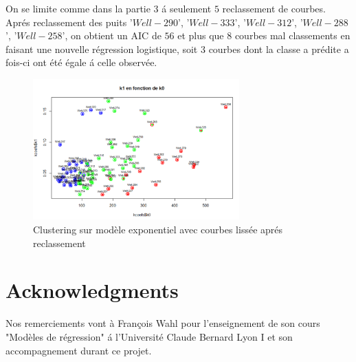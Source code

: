 \documentclass[12pt]{article}
\begin{document}
On se limite comme dans la partie $3$ \'a seulement $5$ reclassement de courbes.
Apr\'es reclassement des puits  '$Well-290$', '$Well-333$', '$Well-312$', '$Well-288$', '$Well-258$', on obtient un AIC de $56$ et plus que $8$ courbes mal classements en faisant une nouvelle r\'egression logistique, soit $3$ courbes dont la classe a  pr\'edite a fois-ci ont \'et\'e \'egale \'a celle observ\'ee.

\begin{figure}[H]
 \centering %
	\includegraphics[width=300px]{smooth_clustering_exp_2}
  \caption{\label{fig:reg_exp_clust_2} Clustering sur mod\`ele exponentiel avec courbes liss\'ee apr\'es reclassement}
\end{figure}



\section*{Acknowledgments}
Nos remerciements vont \`a Fran\c cois Wahl pour l'enseignement de son cours "Mod\`eles de r\'egression" \'a l'Universit\'e Claude Bernard Lyon I et son accompagnement durant ce projet.
\end{document}
